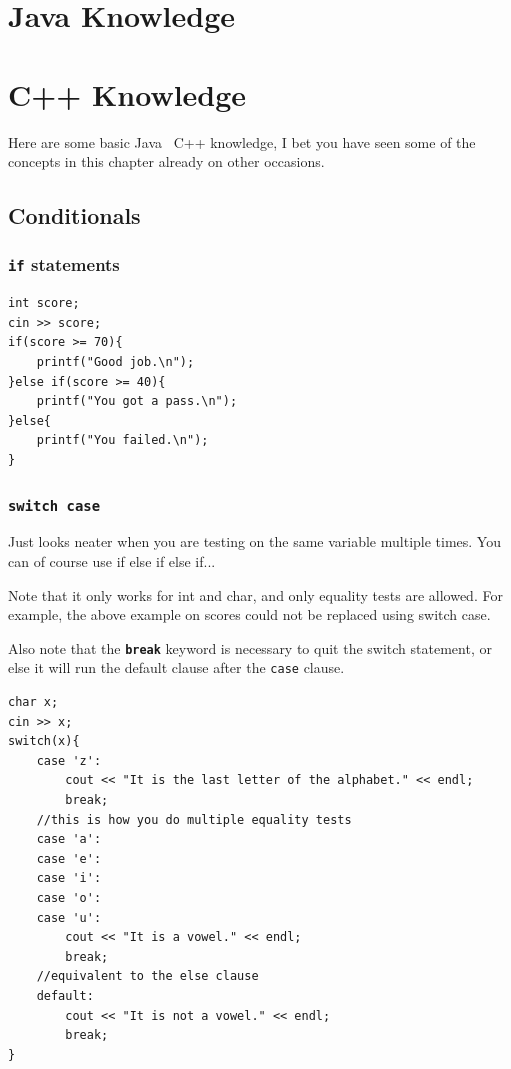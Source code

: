 
\if{}
\chapter{Java Knowledge}
\else
\chapter{C++ Knowledge}
\fi


Here are some basic\if{} Java \else ~C++ \fi knowledge, I bet you have seen some of the concepts in this chapter already on other occasions.


\section{Conditionals}
\subsection{\texttt{if} statements}

\begin{lstlisting}
int score;
cin >> score;
if(score >= 70){
    printf("Good job.\n");
}else if(score >= 40){
    printf("You got a pass.\n");
}else{
    printf("You failed.\n");
}
\end{lstlisting}

\subsection{\texttt{switch case}}

Just looks neater when you are testing on the same variable multiple times. You can of course use if else if else if... 

Note that it only works for int and char, and only equality tests are allowed. For example, the above example on scores could not be replaced using switch case.

Also note that the \textbf{\texttt{break}} keyword is necessary to quit the switch statement, or else it will run the default clause after the \texttt{case} clause.

\begin{lstlisting}
char x;
cin >> x;
switch(x){
    case 'z':
        cout << "It is the last letter of the alphabet." << endl;
        break;
    //this is how you do multiple equality tests
    case 'a':
    case 'e':
    case 'i':
    case 'o':
    case 'u':
        cout << "It is a vowel." << endl;
        break;
    //equivalent to the else clause
    default:
        cout << "It is not a vowel." << endl;
        break;
}
\end{lstlisting}

